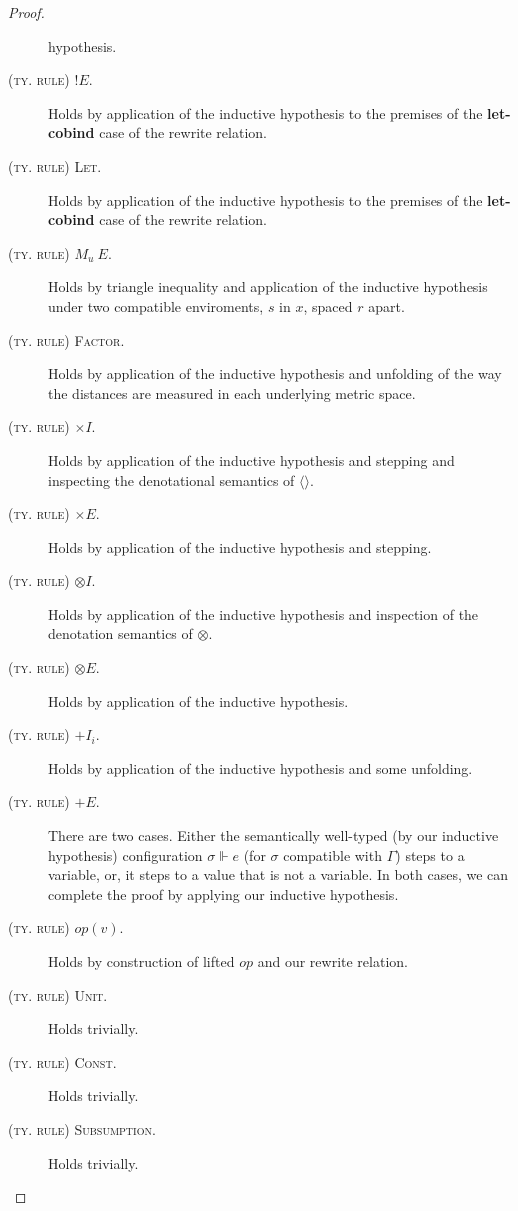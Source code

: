 \begin{proof}
\begin{description}
    hypothesis.
  \item[\textsc{(ty. rule) $! E$.}] Holds by application of the inductive
    hypothesis to the premises of the \textbf{let-cobind} case of the rewrite
    relation.
  \item[\textsc{(ty. rule) Let.}] Holds by application of the inductive
    hypothesis to the premises of the \textbf{let-cobind} case of the rewrite
    relation.
  \item[\textsc{(ty. rule) $M_u \ E$.}] Holds by triangle inequality and
    application of the inductive hypothesis under two compatible enviroments,
    $s$ in $x$, spaced $r$ apart.
  \item[\textsc{(ty. rule) Factor.}] Holds by application of the inductive
    hypothesis and unfolding of the way the distances are measured in each
    underlying metric space.
  \item[\textsc{(ty. rule) $\times I$.}] Holds by application of the inductive
    hypothesis and stepping and inspecting the denotational semantics of
    $\langle \rangle$.
  \item[\textsc{(ty. rule) $\times E$.}] Holds by application of the inductive
    hypothesis and stepping.
  \item[\textsc{(ty. rule) $\otimes I$.}] Holds by application of the inductive
    hypothesis and inspection of the denotation semantics of $\otimes$.
  \item[\textsc{(ty. rule) $\otimes E$.}] Holds by application of the inductive
    hypothesis.
  \item[\textsc{(ty. rule) $+ I_i$.}] Holds by application of the inductive
    hypothesis and some unfolding.
  \item[\textsc{(ty. rule) $+ E$.}] There are two cases. Either the semantically
    well-typed (by our inductive hypothesis) configuration $\sigma \Vdash e$
    (for $\sigma$ compatible with $\Gamma$) steps to a variable, or, it steps to
    a value that is not a variable. In both cases, we can complete the proof by
    applying our inductive hypothesis.
  \item[\textsc{(ty. rule) $\textit{op}(v)$.}] Holds by construction of
    lifted $\textit{op}$ and our rewrite relation.
  \item[\textsc{(ty. rule) Unit.}] Holds trivially.
  \item[\textsc{(ty. rule) Const.}] Holds trivially.
  \item[\textsc{(ty. rule) Subsumption.}] Holds trivially.
\end{description}
\end{proof}

